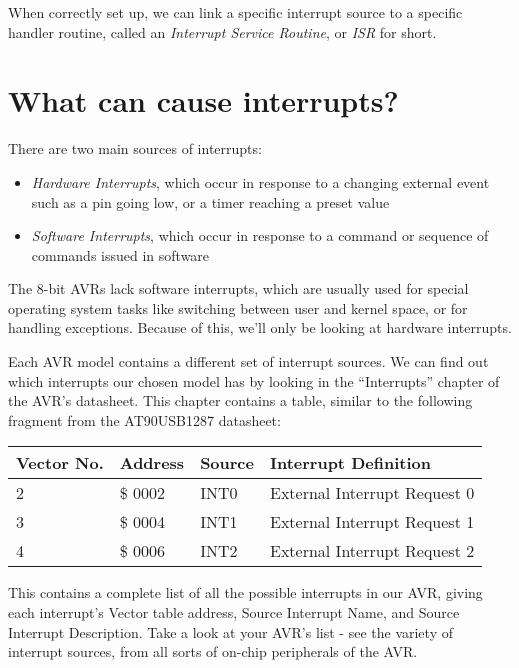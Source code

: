 \documentclass[a4paper,oneside,notitlepage]{book}
\begin{document}
When correctly set up, we can link a specific interrupt source to a specific handler routine, called an \textit{Interrupt Service Routine}, or \textit{ISR} for short.


\label{chp:InterruptCauses}
\chapter{What can cause interrupts?}

There are two main sources of interrupts:

\begin{itemize}
\item \textit{Hardware Interrupts}, which occur in response to a changing external event such as a pin going low, or a timer reaching a preset value
\item \textit{Software Interrupts}, which occur in response to a command or sequence of commands issued in software
\end{itemize}

The 8-bit AVRs lack software interrupts, which are usually used for special operating system tasks like switching between user and kernel space, or for handling exceptions. Because of this, we'll only be looking at hardware interrupts.

Each AVR model contains a different set of interrupt sources. We can find out which interrupts our chosen model has by looking in the ``Interrupts'' chapter of the AVR's datasheet. This chapter contains a table, similar to the following fragment from the AT90USB1287 datasheet: 

\begin{center}
\begin{tabular}{|l|l|l|l|}
	\hline
	Vector No. & Address & Source & Interrupt Definition \\
	\hline
	2          & \$ 0002   & INT0   & External Interrupt Request 0 \\
	3          & \$ 0004   & INT1   & External Interrupt Request 1 \\
	4          & \$ 0006   & INT2   & External Interrupt Request 2 \\
	\hline
\end{tabular}
\end{center}

This contains a complete list of all the possible interrupts in our AVR, giving each interrupt's Vector table address, Source Interrupt Name, and Source Interrupt Description. Take a look at your AVR's list - see the variety of interrupt sources, from all sorts of on-chip peripherals of the AVR.
\end{document}
